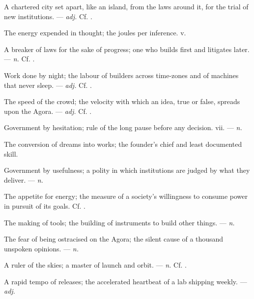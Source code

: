 A chartered city set apart, like an island, from the laws around it, for the trial of new institutions. ---  \textit{adj.} Cf. .

 The energy expended in thought; the joules per inference.   v.

 A breaker of laws for the sake of progress; one who builds first and litigates later. ---  \textit{n.} Cf. .

 Work done by night; the labour of builders across time-zones and of machines that never sleep. ---  \textit{adj.} Cf. .

 The speed of the crowd; the velocity with which an idea, true or false, spreads upon the Agora. ---  \textit{adj.} Cf. .

 Government by hesitation; rule of the long pause before any decision.   vii. ---  \textit{n.}

 The conversion of dreams into works; the founder's chief and least documented skill.

 Government by usefulness; a polity in which institutions are judged by what they deliver. ---  \textit{n.}

 The appetite for energy; the measure of a society's willingness to consume power in pursuit of its goals. Cf. .

 The making of tools; the building of instruments to build other things. ---  \textit{n.}

 The fear of being ostracised on the Agora; the silent cause of a thousand unspoken opinions. ---  \textit{n.}

 A ruler of the skies; a master of launch and orbit. ---  \textit{n.} Cf. .

 A rapid tempo of releases; the accelerated heartbeat of a lab shipping weekly. ---  \textit{adj.}
